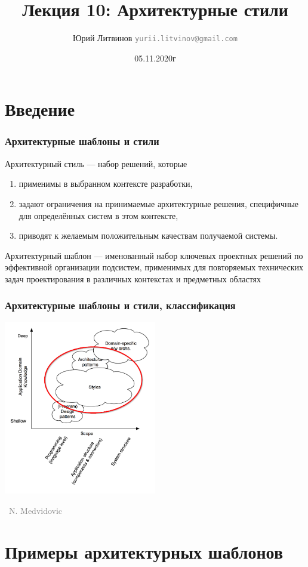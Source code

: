 \documentclass[xetex,mathserif,serif]{beamer}
\title{Лекция 10: Архитектурные стили}
\author[Юрий Литвинов]{Юрий Литвинов \newline \textcolor{gray}{\small\texttt{yurii.litvinov@gmail.com}}}
\date{05.11.2020г}
\newcommand{\attribution}[1] {
    \vspace{-5mm}\begin{flushright}\begin{scriptsize}\textcolor{gray}{\textcopyright\, #1}\end{scriptsize}\end{flushright}
}
\begin{document}
    
    \frame{\titlepage}

    \section{Введение}

    \begin{frame}
        \frametitle{Архитектурные шаблоны и стили}
        Архитектурный стиль --- набор решений, которые
        \begin{enumerate}
            \item применимы в выбранном контексте разработки,
            \item задают ограничения на принимаемые архитектурные решения, специфичные для определённых систем в этом контексте,
            \item приводят к желаемым положительным качествам получаемой системы.
        \end{enumerate}
        Архитектурный шаблон --- именованный набор ключевых проектных решений по эффективной организации подсистем, применимых для повторяемых технических задач проектирования в различных контекстах и предметных областях
    \end{frame}

    \begin{frame}
        \frametitle{Архитектурные шаблоны и стили, классификация}
        \begin{center}
            \includegraphics[width=0.5\textwidth]{architecturalStylesHighlighted.png}
            \attribution{N. Medvidovic}
        \end{center}
    \end{frame}

    \section{Примеры архитектурных шаблонов}
\end{document}
